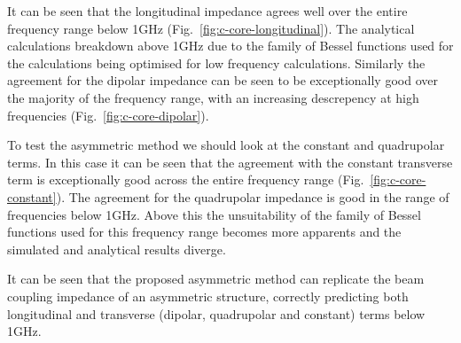 \documentclass[12pt,a4paper,twopage,openright]{article}
\begin{document}
It can be seen that the longitudinal impedance agrees well over the entire frequency range below 1GHz (Fig.~\ref{fig:c-core-longitudinal}). The analytical calculations breakdown above 1GHz due to the family of Bessel functions used for the calculations being optimised for low frequency calculations. Similarly the agreement for the dipolar impedance can be seen to be exceptionally good over the majority of the frequency range, with an increasing descrepency at high frequencies (Fig.~\ref{fig:c-core-dipolar}).

To test the asymmetric method we should look at the constant and quadrupolar terms. In this case it can be seen that the agreement with the constant transverse term is exceptionally good across the entire frequency range (Fig.~\ref{fig:c-core-constant}). The agreement for the quadrupolar impedance is good in the range of frequencies below 1GHz. Above this the unsuitability of the family of Bessel functions used for this frequency range becomes more apparents and the simulated and analytical results diverge.

It can be seen that the proposed asymmetric method can replicate the beam coupling impedance of an asymmetric structure, correctly predicting both longitudinal and transverse (dipolar, quadrupolar and constant) terms below 1GHz. 

%
%
%
%
%
%
%
%
%
%
%



\end{document}
